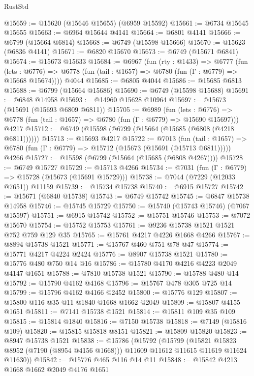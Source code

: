 \begin{lexlean}{RustStd}
\begin{coremodule}
@15659 := @15620 (@15646 @15655) (@6959 @15592)
@15661 := @6734 @15645 @15655
@15663 := @6964 @15644 @4141
@15664 := @6801 @4141
@15666 := @6799 (@15664 @6814)
@15668 := @6749 (@15598 @15666)
@15670 := @15623 (@6836 @4141)
@15671 := @6820 @15670
@15673 := @6749 (@15671 @6841)
@15674 := @15673 @15633
@15684 := @6967
    (fun (rty : @1433) =>
    @6777
      (fun (lets : @6776) =>
      @6778 (fun (tail : @1657) => @6780 (fun (Γ : @6779) => @15668 @15674))))
    @4044
@15685 := @6805 @4044
@15686 := @15685 @6813
@15688 := @6799 (@15664 @15686)
@15690 := @6749 (@15598 @15688)
@15691 := @6848 @14958
@15693 := @14960 @15628 @10964
@15697 := @15673 (@15691 (@15693 @6809 @6811))
@15705 := @6989
    (fun (lets : @6776) => @6778 (fun (tail : @1657) => @6780 (fun (Γ : @6779) => @15690 @15697)))
    @4217
@15712 := @6749 (@15598 (@6799 (@15664 (@15685 (@6808 (@4218 @6811))))))
@15713 := @15693 @4217
@15722 := @7013
    (fun (tail : @1657) => @6780 (fun (Γ : @6779) => @15712 (@15673 (@15691 (@15713 @6811)))))
    @4266
@15727 := @15598 (@6799 (@15664 (@15685 (@6808 @4267))))
@15728 := @6749 @15727
@15729 := @15713 @4266
@15734 := @7031 (fun (Γ : @6779) => @15728 (@15673 (@15691 @15729)))
@15738 := @7044 (@7229 (@12033 @7651)) @11159
@15739 := @15734 @15738
@15740 := @6915 @15727
@15742 := @15671 (@6840 @15738)
@15743 := @6749 @15742
@15745 := @6847 @15738 @14958
@15746 := @15745 @15729
@15750 := @15740 (@15743 @15746) (@7067 @15597)
@15751 := @6915 @15742
@15752 := @15751 @15746
@15753 := @7072 @15670
@15754 := @15752 @15753
@15761 := @9236 @15738 @1521 @1521 @752 @759 @129 @35
@15765 := @15761 @4217 @4226 @1668 @4266
@15767 := @8894 @15738 @1521
@15771 := @15767 @460 @751 @78 @47
@15774 := @15771 @4217 @4224 @2424
@15776 := @8907 @15738 @1521
@15780 := @15776 @480 @750 @14 @16
@15786 := @15780 @4170 @4216 @4223 @2049 @4147 @1651
@15788 := @7810 @15738 @1521
@15790 := @15788 @480 @14
@15792 := @15790 @4162 @4168
@15796 := @15767 @478 @305 @725 @14
@15799 := @15796 @4162 @4166 @2452
@15800 := @15776 @129
@15807 := @15800 @116 @35 @11 @1840 @1668 @1662 @2049
@15809 := @15807 @4155 @1651
@15811 := @7141 @15738 @1521
@15814 := @15811 @109 @35 @109
@15815 := @15814 @1840
@15816 := @7150 @15738
@15818 := @7149 (@15816 @109)
@15820 := @15815 @15818 @8151
@15821 := @15809 @15820
@15823 := @8947 @15738 @1521
@15838 := @15786
    (@15792
      (@15799
        (@15821 @15823 @8952 (@7190 (@8954 @4156 @1668)))
        @11609
        @11612
        @11615
        @11619
        @11624
        @11630))
@15842 := @15776 @465 @116 @14 @11
@15848 := @15842 @4213 @1668 @1662 @2049 @4176 @1651

\end{coremodule}
\end{lexlean}
